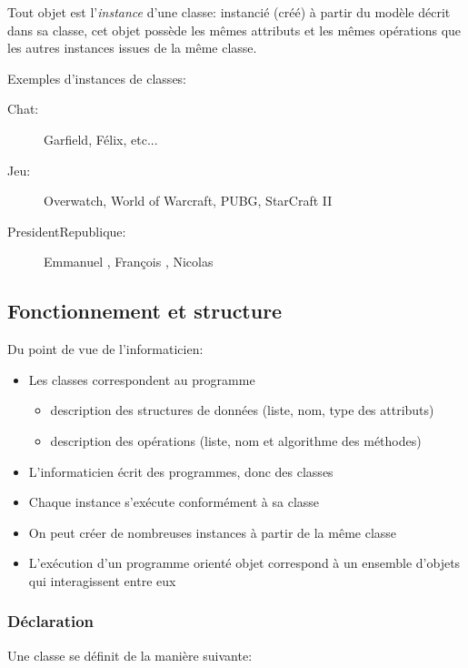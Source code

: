 		Tout objet est l'\emph{instance} d'une classe: instancié (créé) à partir du modèle décrit dans sa classe, cet objet possède les mêmes attributs et les mêmes opérations que les autres instances issues de la même classe.
		
		\begin{exemple}
			Exemples d'instances de classes:
			\begin{description}
				\item[Chat:] Garfield, Félix, etc...
				\item[Jeu:] Overwatch, World of Warcraft, PUBG, StarCraft II
				\item[PresidentRepublique:] Emmanuel , François , Nicolas 
			\end{description}
		\end{exemple}
	
		\subsection{Fonctionnement et structure}
		
		Du point de vue de l'informaticien:
		\begin{itemize}
			\item Les classes correspondent au programme
			\begin{itemize}
				\item description des structures de données (liste, nom, type des attributs)
				\item description des opérations (liste, nom et algorithme des méthodes)
			\end{itemize}
			\item L'informaticien écrit des programmes, donc des classes
			\item Chaque instance s'exécute conformément à sa classe
			\item On peut créer de nombreuses instances à partir de la même classe
			\item L'exécution d'un programme orienté objet correspond à un ensemble d'objets qui interagissent entre eux
		\end{itemize}
	
			\subsubsection{Déclaration}
	
				Une classe se définit de la manière suivante:
				
				
